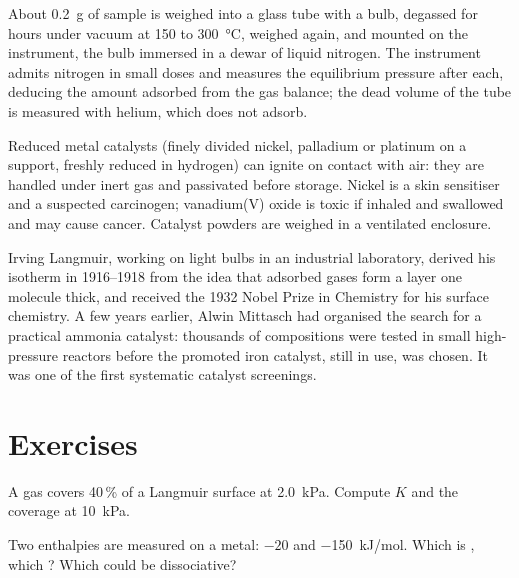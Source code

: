 \begin{inthelab}
About \qty{0.2}{g} of sample is weighed into a glass tube with a bulb, degassed
for hours under vacuum at 150 to \qty{300}{\celsius}, weighed again, and mounted on the
instrument, the bulb immersed in a dewar of liquid nitrogen. The instrument
admits nitrogen in small doses and measures the equilibrium pressure after each,
deducing the amount adsorbed from the gas balance; the dead volume of the tube
is measured with helium, which does not adsorb.
\end{inthelab}

\begin{safety}{}
Reduced metal catalysts (finely divided nickel, palladium or platinum on a
support, freshly reduced in hydrogen) can ignite on contact with air: they are
handled under inert gas and passivated before storage. Nickel is a skin
sensitiser and a suspected carcinogen; vanadium(V) oxide is toxic if inhaled
and swallowed and may cause cancer. Catalyst powders are weighed in a
ventilated enclosure.
\end{safety}

\begin{history}
Irving Langmuir, working on light bulbs in an industrial laboratory, derived
his isotherm in 1916--1918 from the idea that adsorbed gases form a layer one
molecule thick, and received the 1932 Nobel Prize in Chemistry for his surface
chemistry. A few years earlier, Alwin Mittasch had organised the search for a
practical ammonia catalyst: thousands of compositions were tested in small
high-pressure reactors before the promoted iron catalyst, still in use, was
chosen. It was one of the first systematic catalyst screenings.
\end{history}

\section{Exercises}

\begin{exercise}[$\star$]\label{exo:b3:surfaces-catalysis:1}
A gas covers 40\,\% of a Langmuir surface at \qty{2.0}{kPa}. Compute $K$ and the coverage at
\qty{10}{kPa}.
\end{exercise}

\begin{exercise}[$\star$]\label{exo:b3:surfaces-catalysis:2}
Two  enthalpies are measured on a metal: $-20$ and \qty{-150}{kJ/mol}. Which
is , which ? Which could be dissociative?
\end{exercise}

